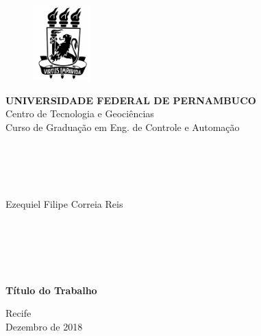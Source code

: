 \begin{titlepage}
\begin{center}

	\vspace{-0.5cm}

  \begin{figure}[hbt!]
		\begin{flushleft}
		   \includegraphics[width=2.25cm,height=2.91cm]{./01_Pre_textuais/logoUfpe_pb.png}
		\end{flushleft}
	\end{figure}
	\vspace{-4cm}

  \hspace{2cm}\large{\textbf{UNIVERSIDADE FEDERAL DE PERNAMBUCO}}\\
  \hspace{2cm}\large{Centro de Tecnologia e Geociências}\\
  \hspace{2cm}\large{Curso de Graduação em Eng. de Controle e Automação}\\

  \hspace{2cm}\large{}\\
  \hspace{2cm}\large{}\\
  \hspace{2cm}\large{}\\
  \hspace{2cm}\large{}\\

  \par
  \large{Ezequiel Filipe Correia Reis}

  \hspace{2cm}\large{}\\
  \hspace{2cm}\large{}\\
  \hspace{2cm}\large{}\\
  \hspace{2cm}\large{}\\


  \par
  \large\textbf{Título do Trabalho}


  \par\vfill
  Recife\\Dezembro de 2018

\end{center}
\end{titlepage}